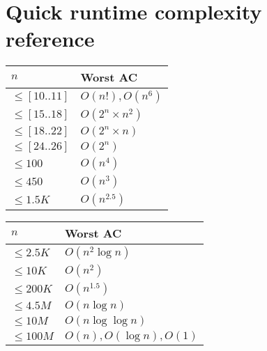 \section{Quick runtime complexity reference}

\begin{table}[H]
\parbox{.45\linewidth}{
\centering
\begin{tabular}{@{}ll@{}}
\toprule
$n$                          & Worst AC            \\ \midrule
$\leq \left[ 10..11 \right]$ & $O(n!), O(n^6)$     \\
$\leq \left[ 15..18 \right]$ & $O(2^n \times n^2)$ \\
$\leq \left[ 18..22 \right]$ & $O(2^n \times n)$      \\ 
$\leq \left[ 24..26 \right]$ & $O(2^n)$               \\ 
$\leq 100$ & $O(n^4)$               \\
$\leq 450$ & $O(n^3)$ \\
$\leq 1.5K$ & $O(n^{2.5})$ \\ 
\end{tabular}}
\hfill
\parbox{.45\linewidth}{
\centering
\begin{tabular}{@{}ll@{}}
\toprule
$n$                          & Worst AC            \\ \midrule
$\leq 2.5K$ & $O(n^2 \log n)$ \\
$\leq 10K$ & $O(n^2)$ \\
$\leq 200K$ & $O(n^{1.5})$ \\
$\leq 4.5M$ & $O(n \log n)$ \\
$\leq 10M$ & $O(n \log \log n)$ \\
$\leq 100M$ & $O(n), O(\log n), O(1)$ \\ 
\end{tabular}}
\end{table}
